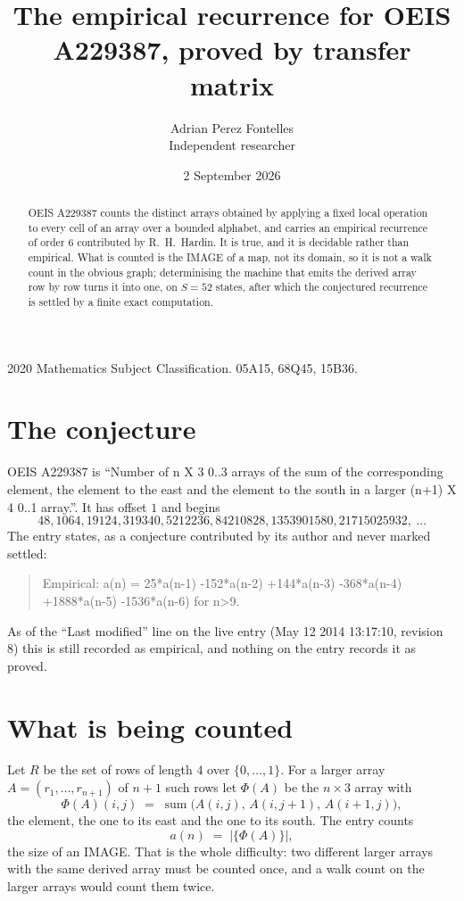 \documentclass[11pt,a4paper]{article}
\title{The empirical recurrence for OEIS A229387, proved by transfer matrix}
\author{Adrian Perez Fontelles\\ \small Independent researcher}
\date{2 September 2026}
\theoremstyle{plain}
\theoremstyle{definition}
\begin{document}
\maketitle

\begin{abstract}
OEIS A229387 counts the distinct arrays obtained by applying a fixed local operation to every cell
of an array over a bounded alphabet, and carries an empirical recurrence of order $6$
contributed by R.~H.~Hardin. It is true, and it is decidable rather than empirical. What is
counted is the IMAGE of a map, not its domain, so it is not a walk count in the obvious graph;
determinising the machine that emits the derived array row by row turns it into one, on
$S=52$ states, after which the conjectured recurrence is settled by a finite exact
computation.
\end{abstract}

\noindent\small 2020 Mathematics Subject Classification. 05A15, 68Q45, 15B36.\normalsize

\section{The conjecture}

OEIS A229387 is ``Number of n X 3 0..3 arrays of the sum of the corresponding element, the element to the east and the element to the south in a larger (n+1) X 4 0..1 array.''. It has offset $1$ and begins
\[
48, 1064, 19124, 319340, 5212236, 84210828, 1353901580, 21715025932,\ \dots
\]
The entry states, as a conjecture contributed by its author and never marked settled:
\begin{quote}
Empirical: a(n) = 25*a(n-1) -152*a(n-2) +144*a(n-3) -368*a(n-4) +1888*a(n-5) -1536*a(n-6) for n>9.
\end{quote}
As of the ``Last modified'' line on the live entry (May 12 2014 13:17:10, revision 8) this is still
recorded as empirical, and nothing on the entry records it as proved.

\section{What is being counted}

Let $R$ be the set of rows of length $4$ over $\{0,\dots,1\}$.
For a larger array $A=(r_1,\dots,r_{n+1})$ of $n+1$ such rows let $\Phi(A)$ be the
$n\times3$ array with
\[
\Phi(A)(i,j)\;=\;\operatorname{sum}\bigl(A(i,j),\,A(i,j+1),\,A(i+1,j)\bigr),
\]
the element, the one to its east and the one to its south. The entry counts
\[
a(n)\;=\;\bigl|\{\Phi(A)\}\bigr| ,
\]
the size of an IMAGE. That is the whole difficulty: two different larger arrays with the same
derived array must be counted once, and a walk count on the larger arrays would count them
twice.
\end{document}
